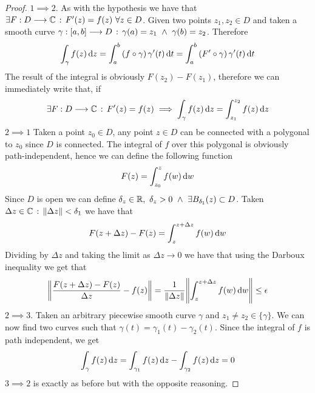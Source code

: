 \documentclass[../complete.tex]{subfiles}
\begin{document}
\begin{proof}
	$1\implies2$. As with the hypothesis we have that $\exists F:D\overset{}{\longrightarrow}\mathbb{C}\, :\,  F'(z)=f(z)\ \forall z\in D$. Given two points $z_1,z_2\in D$ and taken a smooth curve $\gamma:[a,b]\overset{}{\longrightarrow} D\, :\, \gamma(a)=z_1\ \wedge\ \gamma(b)=z_2$. Therefore
	\begin{equation*}
		\int_{\gamma}^{}f(z)\operatorname{d\!} z=\int_{a}^{b}\left( f\circ\gamma \right)\gamma'(t)\operatorname{d\!} t=\int_{a}^{b}\left( F'\circ\gamma \right)\gamma'(t)\operatorname{d\!} t
	\end{equation*}
	The result of the integral is obviously $F(z_2)-F(z_1)$, therefore we can immediately write that, if
	\begin{equation*}
		\exists F:D\overset{}{\longrightarrow}\mathbb{C}\, :\,  F'(z)=f(z)\implies\int_{\gamma}^{}f(z)\operatorname{d\!} z=\int_{z_1}^{z_2}f(z)\operatorname{d\!} z
	\end{equation*}
	$2\implies1$ Taken a point $z_0\in D$, any point $z\in D$ can be connected with a polygonal to $z_0$ since $D$ is connected. The integral of $f$ over this polygonal is obviously path-independent, hence we can define the following function
	\begin{equation*}
		F(z)=\int_{z_0}^{z}f(w)\operatorname{d\!} w
	\end{equation*}
	Since $D$ is open we can define $\delta_z\in\R,\ \delta_z>0\ \wedge\ \exists B_{\delta_1}(z)\subset D$. Taken $\Delta z\in\mathbb{C}\, :\, \norm{\Delta z}<\delta_1$ we have that
	\begin{equation*}
		F(z+\Delta z)-F(z)=\int_{z}^{z+\Delta z}f(w)\operatorname{d\!} w
	\end{equation*}
	Dividing by $\Delta z$ and taking the limit as $\Delta z\to 0$ we have that using the Darboux inequality we get that
	\begin{equation*}
		\norm{\frac{F(z+\Delta z)-F(z)}{\Delta z}-f(z)}=\frac{1}{\norm{\Delta z}}\norm{\int_{z}^{z+\Delta z}f(w)\operatorname{d\!} w}\le\epsilon
	\end{equation*}
	$2\implies3$. Taken an arbitrary piecewise smooth curve $\gamma$ and $z_1\ne z_2\in\{\gamma\}$. We can now find two curves such that $\gamma(t)=\gamma_1(t)-\gamma_2(t)$. Since the integral of $f$ is path independent, we get
	\begin{equation*}
		\int_{\gamma}^{}f(z)\operatorname{d\!} z=\int_{\gamma_1}^{}f(z)\operatorname{d\!} z-\int_{\gamma_2}^{}f(z)\operatorname{d\!} z=0
	\end{equation*}
	$3\implies2$ is exactly as before but with the opposite reasoning.
\end{proof}
\end{document}
